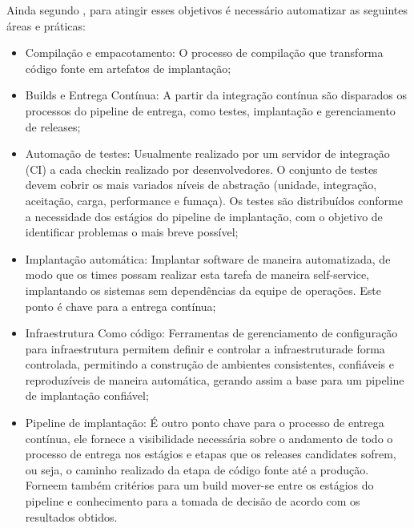 \documentclass[twoside,english,brazilian]{UNISINOSartigo}
\begin{document}
Ainda segundo , para atingir esses objetivos é  necessário automatizar as seguintes áreas e práticas:
\begin{itemize}
\item  Compilação e empacotamento: O processo de compilação que transforma código fonte em artefatos de implantação;
\item  Builds e Entrega Contínua: A partir da integração contínua são disparados os processos do pipeline de entrega, como testes, implantação e gerenciamento de releases;
\item Automação de testes: Usualmente realizado por um servidor de integração (CI) a cada checkin realizado por desenvolvedores. O conjunto de testes devem cobrir os mais variados níveis de abstração (unidade, integração, aceitação, carga, performance e fumaça). Os testes são distribuídos conforme a necessidade dos estágios do pipeline de implantação, com o objetivo de identificar problemas o mais breve possível;
\item Implantação automática: Implantar software de maneira automatizada, de modo que os times possam realizar esta tarefa de maneira self-service, implantando os sistemas sem dependências da equipe de operações. Este ponto é chave para a entrega contínua;
\item Infraestrutura Como  código: Ferramentas de gerenciamento de configuração para infraestrutura permitem definir e controlar a infraestruturade forma controlada, permitindo a construção de ambientes consistentes, confiáveis e reproduzíveis de maneira automática, gerando assim a base para um pipeline de implantação confiável;
\item Pipeline de implantação: É outro ponto chave para o processo de entrega contínua, ele fornece a visibilidade necessária sobre o andamento de todo o processo de entrega nos estágios e etapas que os releases candidates sofrem, ou seja, o caminho realizado da etapa de código fonte até a produção. Forneem também critérios para um build mover-se entre os estágios do pipeline e conhecimento para a tomada de decisão de acordo com os resultados obtidos.
\end{itemize}
\end{document}
